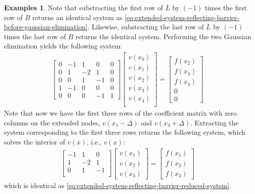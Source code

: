 \documentclass[11pt]{article}
\theoremstyle{definition}
\newtheorem{example}{Examples}[section]
\begin{document}
\begin{example}
	Note that substracting the first row of $\overline{L}$ by $(-1)$ times the first row of $B$ returns an identical system as \eqref{eq:extended-system-reflecting-barrier-before-gaussian-elimination}. Likewise, substracting the last row of $\overline{L}$ by $(-1)$ times the last row of $B$ returns the identical system. Performing the two Gaussian elimination yields the following system:
	\begin{align}\label{eq:extended-system-reflecting-barrier-after-gaussian-elimination}
	\begin{bmatrix}
	0 & -1 & 1 & 0 & 0 \\
	0 & 1 & -2 & 1 & 0 \\
	0 & 0 & 1 & -1 & 0 \\
	1 & -1  & 0 & 0 & 0 \\
	0 & 0 & 0 & -1 & 1
	\end{bmatrix} 	  \begin{bmatrix}
	v(x_0) \\
	v(x_1) \\
	v(x_2) \\
	v(x_3) \\
	v(x_4)  \\
	\end{bmatrix}
	= 
	\begin{bmatrix}
	f(x_2) \\
	f(x_3) \\
	f(x_4) \\
	0 \\
	0 
	\end{bmatrix} 
	\end{align}
	Note that now we have the first three rows of the coefficient matrix with zero columns on the extended nodes, $v(x_1 - \Delta)$ and $v(x_3 + \Delta)$. Extracting the system corresponding to the first three rows returns the following system, which solves the interior of $v(\overline{x})$, i.e., $v(x)$:
	\begin{align}
	\begin{bmatrix}
	-1 & 1 & 0  \\
	1 & -2 & 1 \\
	0 & 1 & -1 \\
	\end{bmatrix} 	  \begin{bmatrix}
	v(x_1) \\
	v(x_2) \\
	v(x_3) 
	\end{bmatrix}
	= 
	\begin{bmatrix}
	f(x_1) \\
	f(x_2) \\
	f(x_3) 
	\end{bmatrix} 
	\end{align}
	which is identical as  \eqref{eq:extended-system-reflecting-barrier-reduced-system}.
\end{example}
\end{document}
